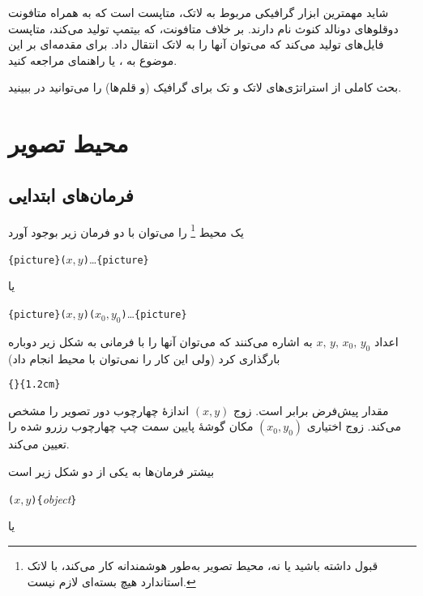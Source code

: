 شاید مهمترین ابزار گرافیکی مربوط به لاتک، متاپست است که به همراه متافونت دوقلوهای دونالد کنوث نام دارند. بر خلاف متافونت، که بیتمپ تولید می‌کند،  
متاپست فایل‌های \PSi تولید می‌کند که می‌توان آنها را به لاتک انتقال داد. برای مقدمه‌ای بر این موضوع به  
\hobby، یا راهنمای 
\cite{ursoswald} مراجعه کنید.

بحث کاملی از استراتژی‌های لاتک و تک برای گرافیک 
(و قلم‌ها)
را می‌توانید در  
\hoenig ببینید.
\section{محیط تصویر}
\subsection{فرمان‌های ابتدایی}

یک محیط  \footnote{قبول داشته باشید یا نه، محیط تصویر به‌طور هوشمندانه کار می‌کند، با لاتک استاندارد هیچ بسته‌ای لازم نیست.} 
را می‌توان با دو فرمان زیر بوجود آورد

\begin{lscommand}
\verb|{picture}(|$x,y$\verb|)|\ldots{}\verb|{picture}|
\end{lscommand}

\noindent یا

\begin{lscommand}
\verb|{picture}(|$x,y$\verb|)(|$x_0,y_0$\verb|)|\ldots{}\verb|{picture}|
\end{lscommand}

اعداد $x,\,y,\,x_0,\,y_0$ به  اشاره می‌کنند که می‌توان آنها را با فرمانی به شکل زیر دوباره بارگذاری کرد
(ولی این کار را نمی‌توان با محیط   انجام داد)

\begin{lscommand}
\verb|{|\verb|}{1.2cm}|
\end{lscommand}

مقدار پیش‌فرض  برابر \lr{\texttt{1pt}} است. زوج $(x,y)$ اندازهٔ چهارچوب دور تصویر را مشخص می‌کند. زوج اختیاری  $(x_0,y_0)$ مکان گوشهٔ پایین سمت چپ چهارچوب رزرو شده را تعیین می‌کند.

بیشتر فرمان‌ها به یکی از دو شکل زیر است

\begin{lscommand}
\verb|(|$x,y$\verb|){|\emph{object}\verb|}|
\end{lscommand}

\noindent یا

